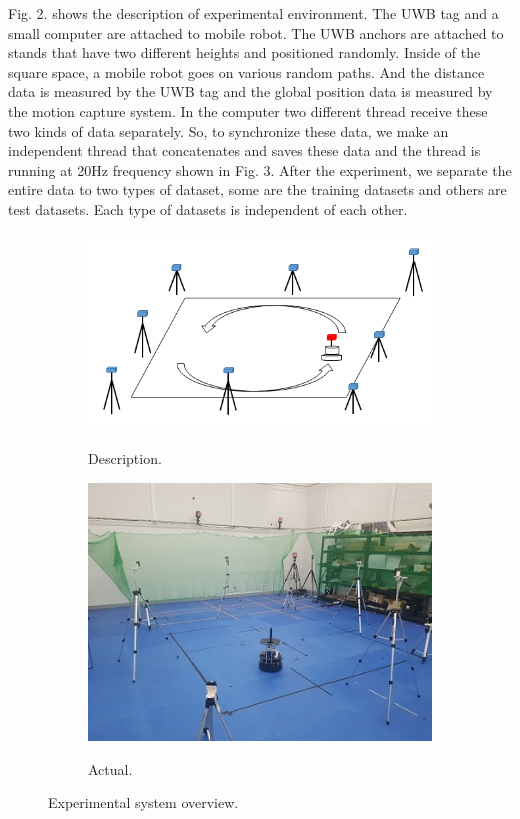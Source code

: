 \documentclass[letterpaper, 10 pt, conference]{ieeeconf}  %
\begin{document}
 Fig. 2. shows the description of experimental environment. The UWB tag and a small computer are attached to mobile robot. The UWB anchors are attached to stands that have two different heights and positioned randomly. Inside of the square space, a mobile robot goes on various random paths. And the distance data is measured by the UWB tag and the global position data is measured by the motion capture system. In the computer two different thread receive these two kinds of data separately. So, to synchronize these data, we make an independent thread that concatenates and saves these data and the thread is running at 20Hz frequency shown in Fig. 3. After the experiment, we separate the entire data to two types of dataset, some are the training datasets and others are test datasets. Each type of datasets is independent of each other.
 \begin{figure}[h]
 	\centering
 	\begin{subfigure}[b]{.25\textwidth}
		\centering
		\includegraphics[width=.9\textwidth]{descriptionSystem}
		\label{fig:sub1} 	
		\caption{Description.}
	\end{subfigure}%
	\begin{subfigure}[b]{.25\textwidth}
		\centering
		\includegraphics[width=.9\textwidth]{actualSystem}
		\label{fig:sub2} 	
		\caption{Actual.}
	\end{subfigure}
	\caption{Experimental system overview.}
	\label{fig:test}
 \end{figure}
\end{document}
